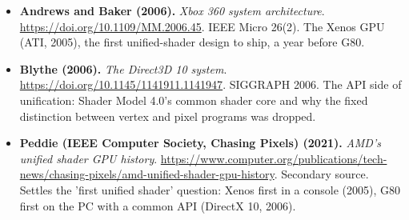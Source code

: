 \begin{itemize}[leftmargin=1.2em,itemsep=3pt]
\item \textbf{Andrews and Baker (2006).} \textit{Xbox 360 system architecture}. \url{https://doi.org/10.1109/MM.2006.45}. IEEE Micro 26(2). The Xenos GPU (ATI, 2005), the first unified-shader design to ship, a year before G80.
\item \textbf{Blythe (2006).} \textit{The Direct3D 10 system}. \url{https://doi.org/10.1145/1141911.1141947}. SIGGRAPH 2006. The API side of unification: Shader Model 4.0's common shader core and why the fixed distinction between vertex and pixel programs was dropped.
\item \textbf{Peddie (IEEE Computer Society, Chasing Pixels) (2021).} \textit{AMD's unified shader GPU history}. \url{https://www.computer.org/publications/tech-news/chasing-pixels/amd-unified-shader-gpu-history}. Secondary source. Settles the 'first unified shader' question: Xenos first in a console (2005), G80 first on the PC with a common API (DirectX 10, 2006).
\end{itemize}
